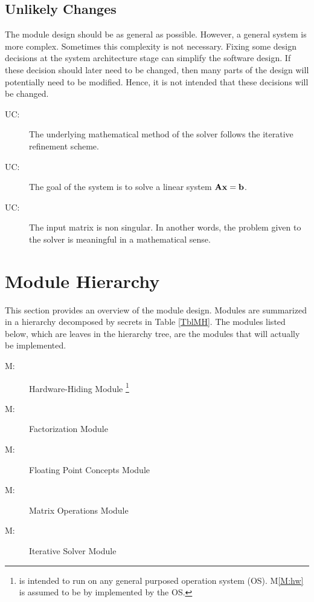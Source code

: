 \documentclass[12pt, titlepage]{article}
\newcounter{ucnum}
\newcommand{\uctheucnum}{UC\theucnum}
\newcounter{mnum}
\newcommand{\mthemnum}{M\themnum}
\newcommand{\mref}[1]{M\ref{#1}}
\begin{document}

\subsection{Unlikely Changes} \label{SecUchange}

The module design should be as general as possible. However, a general system is
more complex. Sometimes this complexity is not necessary. Fixing some design
decisions at the system architecture stage can simplify the software design. If
these decision should later need to be changed, then many parts of the design
will potentially need to be modified. Hence, it is not intended that these
decisions will be changed.

\begin{description}
\item[ \uctheucnum \label{UC:IR}:] The underlying
  mathematical method of the solver follows the iterative refinement scheme.
\item[ \uctheucnum \label{UC:Axb}:] The goal of the system is
  to solve a linear system \(\mathbf{A}\mathbf{x} = \mathbf{b}\).
\item[ \uctheucnum \label{UC:nonsingular}:] The input matrix
  is non singular. In another words, the problem given to the solver is
  meaningful in a mathematical sense.
\end{description}

\section{Module Hierarchy} \label{SecMH}

This section provides an overview of the module design. Modules are summarized
in a hierarchy decomposed by secrets in Table \ref{TblMH}. The modules listed
below, which are leaves in the hierarchy tree, are the modules that will
actually be implemented.

\begin{description}
\item [ \mthemnum \label{M:hw}:] Hardware-Hiding Module
  \footnote{\progname{} is intended to run on any general purposed operation
    system (OS). \mref{M:hw} is assumed to be by implemented by the OS.}
\item [ \mthemnum \label{M:factor}:] Factorization
  Module
\item [ \mthemnum \label{M:concepts}:] Floating Point Concepts Module
\item [ \mthemnum \label{M:ops}:] Matrix Operations Module
\item [ \mthemnum \label{M:solve}:] Iterative Solver Module
\end{description}
\end{document}
